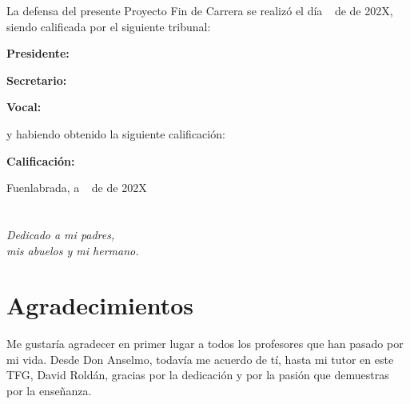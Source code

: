\documentclass[a4paper, 12pt, oneside]{book}
\begin{document}
\vspace{1cm}
La defensa del presente Proyecto Fin de Carrera se realizó el día \qquad$\;\,$ de \qquad\qquad\qquad\qquad \newline de 202X, siendo calificada por el siguiente tribunal:


\vspace{0.5cm}
\textbf{Presidente:}

\vspace{1.2cm}
\textbf{Secretario:}

\vspace{1.2cm}
\textbf{Vocal:}


\vspace{1.2cm}
y habiendo obtenido la siguiente calificación:

\vspace{1cm}
\textbf{Calificación:}


\vspace{1cm}
\begin{flushright}
Fuenlabrada, a \qquad$\;\,$ de \qquad\qquad\qquad\qquad de 202X
\end{flushright}


\chapter*{}
\begin{flushright}
\textit{Dedicado a 
mi padres, \\
mis abuelos 
y mi hermano.}
\end{flushright}


\chapter*{Agradecimientos}

Me gustaría agradecer en primer lugar a todos los profesores que han pasado por mi vida. Desde Don Anselmo, todavía me acuerdo de tí, hasta mi tutor en este TFG, David Roldán, gracias por la dedicación y por la pasión que demuestras por la enseñanza.
\end{document}
